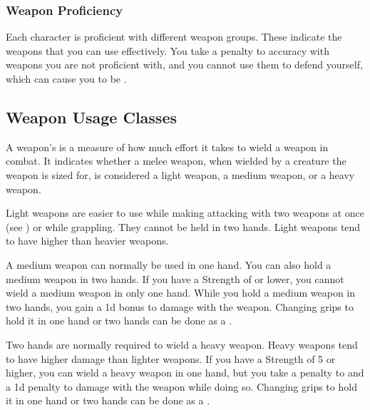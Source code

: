         \subsubsection{Weapon Proficiency}\label{Weapon Proficiency}
            Each character is proficient with different weapon groups. These indicate the weapons that you can use effectively. You take a  penalty to accuracy with weapons you are not proficient with, and you cannot use them to defend yourself, which can cause you to be .

    \subsection{Weapon Usage Classes}\label{Weapon Usage Classes}
        A weapon's  is a measure of how much effort it takes to wield a weapon in combat.
        It indicates whether a melee weapon, when wielded by a creature the weapon is sized for, is considered a light weapon, a medium weapon, or a heavy weapon.


        \label{Light Weapons} Light weapons are easier to use while making attacking with two weapons at once (see ) or while grappling.
        They cannot be held in two hands.
        Light weapons tend to have higher  than heavier weapons.

         A medium weapon can normally be used in one hand.
        You can also hold a medium weapon in two hands.
        If you have a Strength of  or lower, you cannot wield a medium weapon in only one hand.
        While you hold a medium weapon in two hands, you gain a \plus1d bonus to damage with the weapon.
        Changing grips to hold it in one hand or two hands can be done as a .

         Two hands are normally required to wield a heavy weapon.
        Heavy weapons tend to have higher damage than lighter weapons.
        If you have a Strength of 5 or higher, you can wield a heavy weapon in one hand, but you take a  penalty to  and a \minus1d penalty to damage with the weapon while doing so.
        Changing grips to hold it in one hand or two hands can be done as a .

